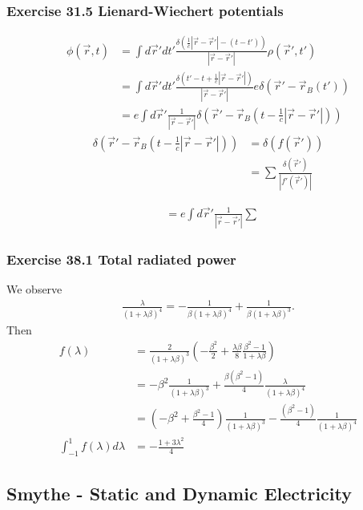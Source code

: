 \documentclass[10pt,a4paper]{article}
\theoremstyle{definition}
\begin{document}
\subsubsection{Exercise 31.5 Lienard-Wiechert potentials}
\begin{align}
\phi(\vec{r},t)&=\int d\vec{r}'dt'\frac{\delta(\frac{1}{c}|\vec{r}-\vec{r}'|-(t-t'))}{|\vec{r}-\vec{r}'|}\rho(\vec{r}',t')\\
&=\int d\vec{r}'dt'\frac{\delta(t'-t+\frac{1}{c}|\vec{r}-\vec{r}'|)}{|\vec{r}-\vec{r}'|}e\delta(\vec{r}'-\vec{r}_B(t'))\\
&=e\int d\vec{r}'\frac{1}{|\vec{r}-\vec{r}'|}\delta(\vec{r}'-\vec{r}_B(t-\frac{1}{c}|\vec{r}-\vec{r}'|))
\end{align}
\begin{align}
\delta(\vec{r}'-\vec{r}_B(t-\frac{1}{c}|\vec{r}-\vec{r}'|))&=\delta(f(\vec{r}'))\\
&=\sum\frac{\delta(\vec{r}')}{|f'(\vec{r}')|}
\end{align}

\begin{align}
&=e\int d\vec{r}'\frac{1}{|\vec{r}-\vec{r}'|}\sum\frac{}{}
\end{align}


\subsubsection{Exercise 38.1 Total radiated power}
We observe
\begin{align}
\frac{\lambda}{(1+\lambda\beta)^4}=-\frac{1}{\beta(1+\lambda\beta)^4}+\frac{1}{\beta(1+\lambda\beta)^3}.    
\end{align}
Then
\begin{align}
    f(\lambda)&=\frac{2}{(1+\lambda\beta)^3}\left(-\frac{\beta^2}{2}+\frac{\lambda\beta}{8}\frac{\beta^2-1}{1+\lambda\beta}\right)\\
    &=-\beta^2\frac{1}{(1+\lambda\beta)^3}+\frac{\beta(\beta^2-1)}{4}\frac{\lambda}{(1+\lambda\beta)^4}\\
    &=\left(-\beta^2+\frac{\beta^2-1}{4}\right)\frac{1}{(1+\lambda\beta)^3}-\frac{(\beta^2-1)}{4}\frac{1}{(1+\lambda\beta)^4}\\
    \int_{-1}^1f(\lambda)d\lambda&=-\frac{1+3\lambda^2}{4}
\end{align}


\subsection{{\sc Smythe} - Static and Dynamic Electricity}
\end{document}
